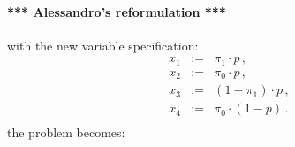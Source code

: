 \documentclass[runningheads]{llncs}
\begin{document}
	
	\paragraph{*** Alessandro's reformulation ***}
	with the new variable specification:
	\begin{eqnarray}
		x_1&:=&\pi_1 \cdot p \,,\\
		x_2&:=&\pi_0 \cdot p \,,\\
		x_3&:=&(1-\pi_1) \cdot p \,,\\
		x_4&:=& \pi_0 \cdot (1-p)\,.\\
	\end{eqnarray}
	the problem becomes:
	
\end{document}
